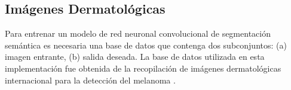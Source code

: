 \documentclass[a0,portrait]{a0poster}
\begin{document}
\begin{multicols}{3}
\section*{Imágenes Dermatológicas}
Para entrenar un modelo de red neuronal convolucional de segmentación semántica es necesaria una base de datos que contenga dos subconjuntos: (a) imagen entrante, (b) salida deseada. La base de datos utilizada en esta implementación fue obtenida de la recopilación de imágenes dermatológicas internacional para la detección del melanoma \citep{isic_skin}.
\vspace{2cm}
\begin{center}
\end{center}



\end{multicols}
\end{document}

